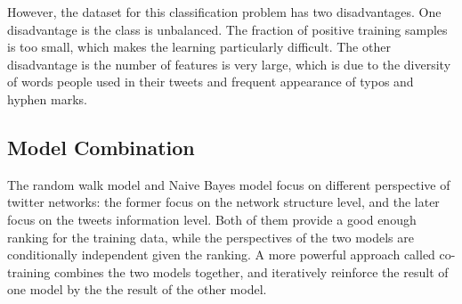 \documentclass{article}
\begin{document}


However, the dataset for this classification problem has two disadvantages. One disadvantage is the class is unbalanced. The fraction of positive training samples is too small, which makes the learning particularly difficult. The other disadvantage is the number of features is very large, which is due to the diversity of words people used in their tweets and frequent appearance of typos and hyphen marks.

\subsection{Model Combination}


The random walk model and Naive Bayes model focus on different perspective of twitter networks: the former focus on the network structure level, and the later focus on the tweets information level. Both of them provide a good enough ranking for the training data, while the perspectives of the two models are conditionally independent given the ranking. A more powerful approach called co-training \cite{cotraining} combines the two models together, and iteratively reinforce the result of one model by the the result of the other model.
\end{document}
